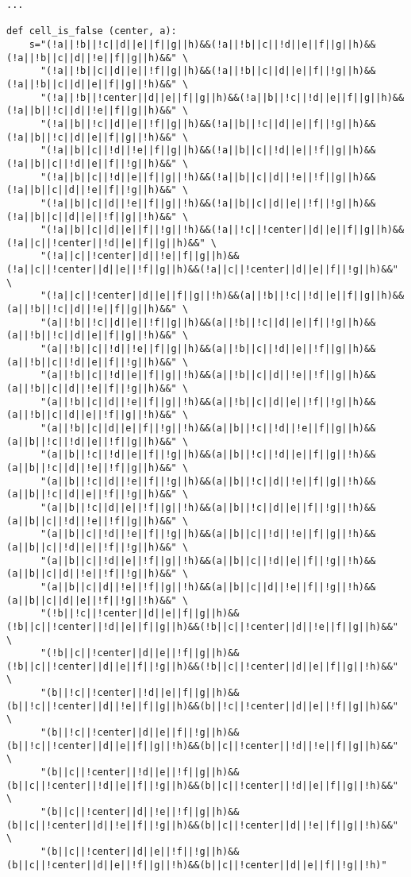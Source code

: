 \begin{lstlisting}
...

def cell_is_false (center, a):
    s="(!a||!b||!c||d||e||f||g||h)&&(!a||!b||c||!d||e||f||g||h)&&(!a||!b||c||d||!e||f||g||h)&&" \
      "(!a||!b||c||d||e||!f||g||h)&&(!a||!b||c||d||e||f||!g||h)&&(!a||!b||c||d||e||f||g||!h)&&" \
      "(!a||!b||!center||d||e||f||g||h)&&(!a||b||!c||!d||e||f||g||h)&&(!a||b||!c||d||!e||f||g||h)&&" \
      "(!a||b||!c||d||e||!f||g||h)&&(!a||b||!c||d||e||f||!g||h)&&(!a||b||!c||d||e||f||g||!h)&&" \
      "(!a||b||c||!d||!e||f||g||h)&&(!a||b||c||!d||e||!f||g||h)&&(!a||b||c||!d||e||f||!g||h)&&" \
      "(!a||b||c||!d||e||f||g||!h)&&(!a||b||c||d||!e||!f||g||h)&&(!a||b||c||d||!e||f||!g||h)&&" \
      "(!a||b||c||d||!e||f||g||!h)&&(!a||b||c||d||e||!f||!g||h)&&(!a||b||c||d||e||!f||g||!h)&&" \
      "(!a||b||c||d||e||f||!g||!h)&&(!a||!c||!center||d||e||f||g||h)&&(!a||c||!center||!d||e||f||g||h)&&" \
      "(!a||c||!center||d||!e||f||g||h)&&(!a||c||!center||d||e||!f||g||h)&&(!a||c||!center||d||e||f||!g||h)&&" \
      "(!a||c||!center||d||e||f||g||!h)&&(a||!b||!c||!d||e||f||g||h)&&(a||!b||!c||d||!e||f||g||h)&&" \
      "(a||!b||!c||d||e||!f||g||h)&&(a||!b||!c||d||e||f||!g||h)&&(a||!b||!c||d||e||f||g||!h)&&" \
      "(a||!b||c||!d||!e||f||g||h)&&(a||!b||c||!d||e||!f||g||h)&&(a||!b||c||!d||e||f||!g||h)&&" \
      "(a||!b||c||!d||e||f||g||!h)&&(a||!b||c||d||!e||!f||g||h)&&(a||!b||c||d||!e||f||!g||h)&&" \
      "(a||!b||c||d||!e||f||g||!h)&&(a||!b||c||d||e||!f||!g||h)&&(a||!b||c||d||e||!f||g||!h)&&" \
      "(a||!b||c||d||e||f||!g||!h)&&(a||b||!c||!d||!e||f||g||h)&&(a||b||!c||!d||e||!f||g||h)&&" \
      "(a||b||!c||!d||e||f||!g||h)&&(a||b||!c||!d||e||f||g||!h)&&(a||b||!c||d||!e||!f||g||h)&&" \
      "(a||b||!c||d||!e||f||!g||h)&&(a||b||!c||d||!e||f||g||!h)&&(a||b||!c||d||e||!f||!g||h)&&" \
      "(a||b||!c||d||e||!f||g||!h)&&(a||b||!c||d||e||f||!g||!h)&&(a||b||c||!d||!e||!f||g||h)&&" \
      "(a||b||c||!d||!e||f||!g||h)&&(a||b||c||!d||!e||f||g||!h)&&(a||b||c||!d||e||!f||!g||h)&&" \
      "(a||b||c||!d||e||!f||g||!h)&&(a||b||c||!d||e||f||!g||!h)&&(a||b||c||d||!e||!f||!g||h)&&" \
      "(a||b||c||d||!e||!f||g||!h)&&(a||b||c||d||!e||f||!g||!h)&&(a||b||c||d||e||!f||!g||!h)&&" \
      "(!b||!c||!center||d||e||f||g||h)&&(!b||c||!center||!d||e||f||g||h)&&(!b||c||!center||d||!e||f||g||h)&&" \
      "(!b||c||!center||d||e||!f||g||h)&&(!b||c||!center||d||e||f||!g||h)&&(!b||c||!center||d||e||f||g||!h)&&" \
      "(b||!c||!center||!d||e||f||g||h)&&(b||!c||!center||d||!e||f||g||h)&&(b||!c||!center||d||e||!f||g||h)&&" \
      "(b||!c||!center||d||e||f||!g||h)&&(b||!c||!center||d||e||f||g||!h)&&(b||c||!center||!d||!e||f||g||h)&&" \
      "(b||c||!center||!d||e||!f||g||h)&&(b||c||!center||!d||e||f||!g||h)&&(b||c||!center||!d||e||f||g||!h)&&" \
      "(b||c||!center||d||!e||!f||g||h)&&(b||c||!center||d||!e||f||!g||h)&&(b||c||!center||d||!e||f||g||!h)&&" \
      "(b||c||!center||d||e||!f||!g||h)&&(b||c||!center||d||e||!f||g||!h)&&(b||c||!center||d||e||f||!g||!h)"


\end{lstlisting}
